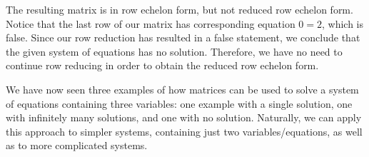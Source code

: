 \documentclass[12pt]{book}
\theoremstyle{definition}
\begin{document}
The resulting matrix is in row echelon form, but not reduced row echelon form.  Notice that the last row of our matrix has corresponding equation $0=2$, which is false.  Since our row reduction has resulted in a false statement, we conclude that the given system of equations has no solution.  Therefore, we have no need to continue row reducing in order to obtain the reduced row echelon form.\par
We have now seen three examples of how matrices can be used to solve a system of equations containing three variables: one example with a single solution, one with infinitely many solutions, and one with no solution.  Naturally, we can apply this approach to simpler systems, containing just two variables/equations, as well as to more complicated systems.
\newpage
\end{document}

